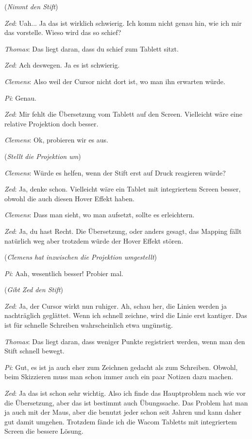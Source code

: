 \medskip (\emph{Nimmt den Stift})

\medskip \emph{Zed}: Uah... Ja das ist wirklich schwierig. Ich komm nicht genau hin, wie ich mir das vorstelle. Wieso wird das so schief?

\medskip \emph{Thomas}: Das liegt daran, dass du schief zum Tablett sitzt.

\medskip \emph{Zed}: Ach deswegen. Ja es ist schwierig.

\medskip \emph{Clemens}: Also weil der Cursor nicht dort ist, wo man ihn erwarten würde.

\medskip \emph{Pi}: Genau.

\medskip \emph{Zed}: Mir fehlt die Übersetzung vom Tablett auf den Screen. Vielleicht wäre eine relative Projektion doch besser.

\medskip \emph{Clemens}: Ok, probieren wir es aus.

\medskip (\emph{Stellt die Projektion um})

\medskip \emph{Clemens}: Würde es helfen, wenn der Stift erst auf Druck reagieren würde?

\medskip \emph{Zed}: Ja, denke schon. Vielleicht wäre ein Tablet mit integriertem Screen besser, obwohl die auch diesen Hover Effekt haben.

\medskip \emph{Clemens}: Dass man sieht, wo man aufsetzt, sollte es erleichtern.

\medskip \emph{Zed}: Ja, du hast Recht. Die Übersetzung, oder anders gesagt, das Mapping fällt natürlich weg aber trotzdem würde der Hover Effekt stören.

\medskip (\emph{Clemens hat inzwischen die Projektion umgestellt})

\medskip \emph{Pi}: Aah, wesentlich besser! Probier mal.

\medskip (\emph{Gibt Zed den Stift})

\medskip \emph{Zed}: Ja, der Cursor wirkt nun ruhiger. Ah, schau her, die Linien werden ja nachträglich geglättet. Wenn ich schnell zeichne, wird die Linie erst kantiger. Das ist für schnelle Schreiben wahrscheinlich etwa ungünstig.

\medskip \emph{Thomas}: Das liegt daran, dass weniger Punkte registriert werden, wenn man den Stift schnell bewegt.

\medskip \emph{Pi}: Gut, es ist ja auch eher zum Zeichnen gedacht als zum Schreiben. Obwohl, beim Skizzieren muss man schon immer auch ein paar Notizen dazu machen.

\medskip \emph{Zed}: Ja das ist schon sehr wichtig. Also ich finde das Hauptproblem nach wie vor die Übersetzung, aber das ist bestimmt auch Übungssache. Das Problem hat man ja auch mit der Maus, aber die benutzt jeder schon seit Jahren und kann daher gut damit umgehen. Trotzdem fände ich die Wacom Tabletts mit integriertem Screen die bessere Lösung. 

